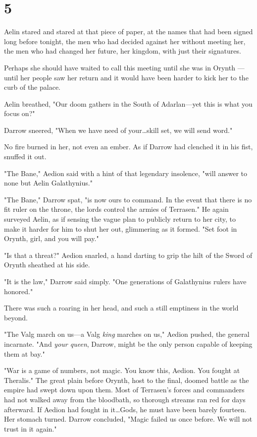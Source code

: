 
\chapter{5}

Aelin stared and stared at that piece of paper, at the names that had been signed long before tonight, the men who had decided against her without meeting her, the men who had changed her future, her kingdom, with just their signatures.

Perhaps she should have waited to call this meeting until she was in Orynth ---until her people saw her return and it would have been harder to kick her to the curb of the palace.

Aelin breathed, "Our doom gathers in the South of Adarlan---yet this is what you focus on?"

Darrow sneered, "When we have need of your\ldots skill set, we will send word."

No fire burned in her, not even an ember.
As if Darrow had clenched it in his fist, snuffed it out.

"The Bane," Aedion said with a hint of that legendary insolence, "will answer to none but Aelin Galathynius."

"The Bane," Darrow spat, "is now ours to command.
In the event that there is no fit ruler on the throne, the lords control the armies of Terrasen."
He again surveyed Aelin, as if sensing the vague plan to publicly return to her city, to make it harder for him to shut her out, glimmering as it formed.
"Set foot in Orynth, girl, and you will pay."

"Is that a threat?"
Aedion snarled, a hand darting to grip the hilt of the Sword of Orynth sheathed at his side.

"It is the law," Darrow said simply.
"One generations of Galathynius rulers have honored."

There was such a roaring in her head, and such a still emptiness in the world beyond.

"The Valg march on us---a Valg \emph{king} marches on us," Aedion pushed, the general incarnate.
"And \emph{your queen}, Darrow, might be the only person capable of keeping them at bay."

"War is a game of numbers, not magic.
You know this, Aedion.
You fought at Theralis."
The great plain before Orynth, host to the final, doomed battle as the empire had swept down upon them.
Most of Terrasen's forces and commanders had not walked away from the bloodbath, so thorough streams ran red for days afterward.
If Aedion had fought in it\ldots Gods, he must have been barely fourteen.
Her stomach turned.
Darrow concluded, "Magic failed us once before.
We will not trust in it again."

